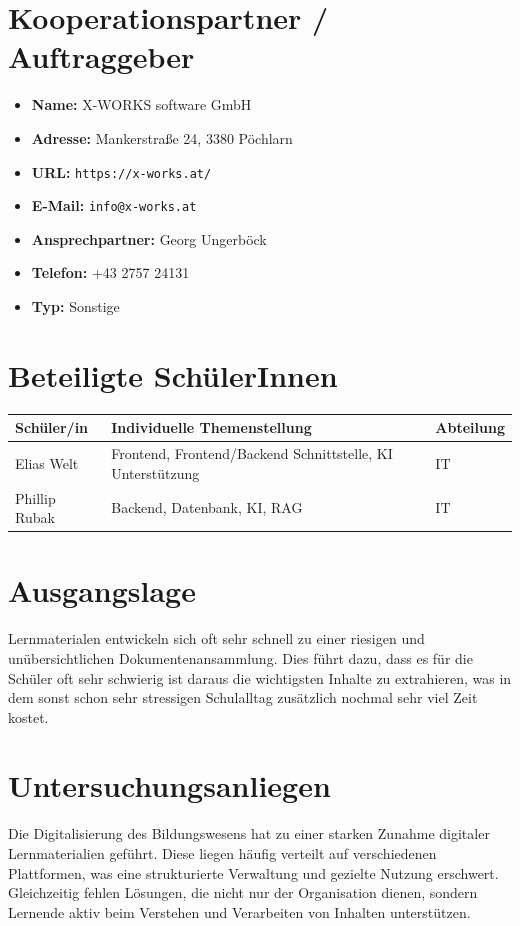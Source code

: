 \section*{Kooperationspartner / Auftraggeber}
\begin{itemize}
    \item \textbf{Name:} X-WORKS software GmbH
    \item \textbf{Adresse:} Mankerstraße 24, 3380 Pöchlarn
    \item \textbf{URL:} \texttt{https://x-works.at/}
    \item \textbf{E-Mail:} \texttt{info@x-works.at}
    \item \textbf{Ansprechpartner:} Georg Ungerböck
    \item \textbf{Telefon:} +43 2757 24131
    \item \textbf{Typ:} Sonstige
\end{itemize}

\section*{Beteiligte SchülerInnen}
\begin{longtable}{lp{}l}
	\toprule
	\textbf{Schüler/in} & \textbf{Individuelle Themenstellung} & \textbf{Abteilung} \\
	\midrule
	Elias Welt & Frontend, Frontend/Backend Schnittstelle, KI Unterstützung & IT \\
	Phillip Rubak & Backend, Datenbank, KI, RAG & IT \\
	\bottomrule
\end{longtable}



\section*{Ausgangslage}
Lernmaterialen entwickeln sich oft sehr schnell zu einer riesigen und unübersichtlichen Dokumentenansammlung. 
Dies führt dazu, dass es für die Schüler oft sehr schwierig ist daraus die wichtigsten Inhalte zu extrahieren, was in dem sonst schon sehr stressigen Schulalltag zusätzlich nochmal sehr viel Zeit kostet.

\section*{Untersuchungsanliegen}
Die Digitalisierung des Bildungswesens hat zu einer starken Zunahme digitaler Lernmaterialien geführt. 
Diese liegen häufig verteilt auf verschiedenen Plattformen, was eine strukturierte Verwaltung und gezielte Nutzung erschwert. 
Gleichzeitig fehlen Lösungen, die nicht nur der Organisation dienen, sondern Lernende aktiv beim Verstehen und Verarbeiten von Inhalten unterstützen.

